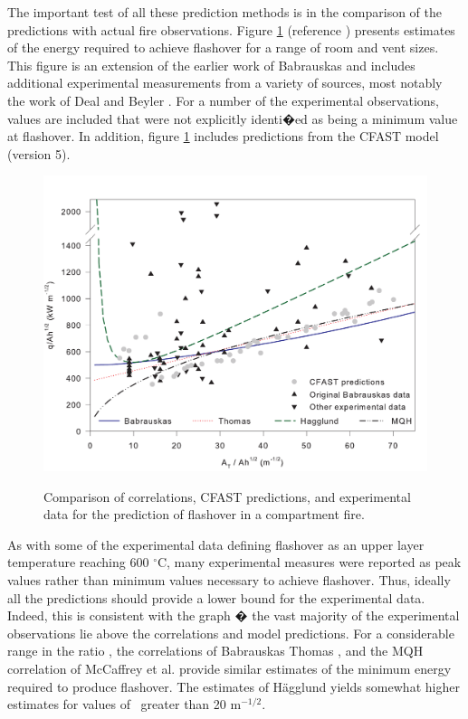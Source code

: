 The important test of all these prediction methods is in the comparison of the predictions with
actual fire observations. Figure \ref{figValidFlashover} (reference \cite{Valid:Peacock_Flashover_2}) presents estimates of the energy required to achieve flashover for a range of room and vent sizes. This figure is an extension of the earlier work of Babrauskas  \cite{Valid:Babrauskas_Flashover} and includes additional experimental measurements from a variety of sources, most notably the work of Deal and Beyler \cite{Valid:DealandBeyler}. For a number of the experimental observations, values are included that were not 
explicitly identi�ed as being a minimum value at flashover. In addition, figure \ref{figValidFlashover} includes predictions from the CFAST model (version 5).

\begin{figure}[\figoptions{b}]
\begin{center}
\includegraphics[width=5.0000in]{FIGURES/flashover.pdf}\\
\end{center}
\caption{Comparison of correlations, CFAST predictions, and experimental data for the prediction of flashover in a compartment fire.}
 \label{figValidFlashover}
\end{figure}

As with some of the experimental data defining flashover as an upper layer temperature reaching
600 $^{\circ}$C, many experimental measures were reported as peak values rather than minimum values necessary to achieve flashover. Thus, ideally all the predictions should provide a lower bound
for the experimental data. Indeed, this is consistent with the graph � the vast majority of the
experimental observations lie above the correlations and model predictions. For a considerable
range in the ratio \asqh, the correlations of Babrauskas \cite{Valid:Babrauskas_Flashover} Thomas \cite{Thomas:1981fk}, and the MQH correlation of McCaffrey et al. \cite{McCaffrey:1981uq} provide similar estimates of the minimum energy required to produce flashover. The estimates of H\"{a}gglund \cite{Hagglund:1980} yields somewhat higher estimates for values of \asqh  \, greater than 20 m$^{-1/2}$.

